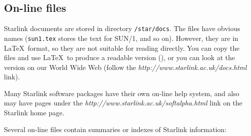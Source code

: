\documentclass[twoside,11pt,nolof]{starlink}
\begin{document}
\subsection{On-line files}

Starlink documents are stored in directory \texttt{/star/docs}.
The files have obvious names (\texttt{sun1.tex} stores the text for SUN/1, and so
on).
However, they are in \LaTeX\ format, so they are not suitable for reading
directly.
You can copy the files and use \LaTeX\ to produce a readable version
(),
or you can look at the version on our World Wide Web (follow the
\emph{
{http://www.starlink.ac.uk/docs.html}}\/
link).

Many Starlink software packages have their own on-line help system, and also
may have pages under the
\emph{
{http://www.starlink.ac.uk/softalpha.html}}\/
link on the Starlink home page.

Several on-line files contain summaries or indexes of Starlink information:

\newpage
\end{document}
